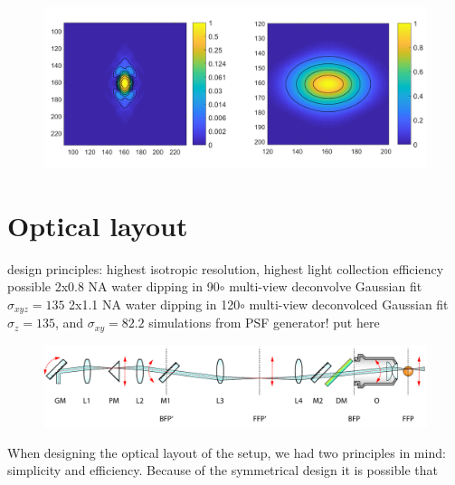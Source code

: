   \begin{figure}
    \centering
    \includegraphics[width=1\textwidth]{psfs/SPIMx120.pdf}
    \label{fig:psf-spimx120}
  \end{figure}
      


\section{Optical layout}
  design principles:
  highest isotropic resolution, highest light collection efficiency possible
  2x0.8 NA water dipping in 90$\circ$ multi-view deconvolve Gaussian fit $\sigma_{xyz}=135$
  2x1.1 NA water dipping in 120$\circ$ multi-view deconvolced Gaussian fit $\sigma_z = 135$, and $\sigma_{xy} = 82.2$
  simulations from PSF generator! put here

  \begin{figure}[bth]
    \centering
    \includegraphics[page=1,width=1\textwidth]{schematicsLinear}
    \label{fig:schematicsLinear}
  \end{figure}

  When designing the optical layout of the setup, we had two principles in mind: simplicity and efficiency. Because of the symmetrical design it is possible that

